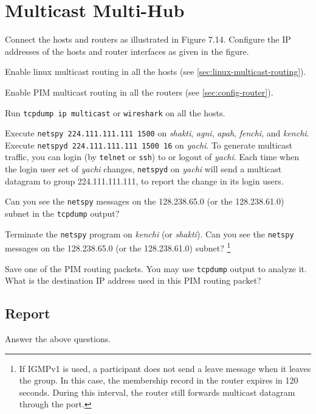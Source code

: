 \documentclass{../UTNetLab}
\begin{document}
\section{Multicast Multi-Hub}
    Connect the hosts and routers as illustrated in Figure 7.14.
    Configure the IP addresses of the hosts and router interfaces as given in the figure.


    Enable linux multicast routing in all the hosts (see \autoref{sec:linux-multicast-routing}).

    Enable PIM multicast routing in all the routers (see \autoref{sec:config-router}). 

    Run \lstinline{tcpdump ip multicast} or \lstinline{wireshark} on all the hosts. 

    Execute \lstinline{netspy 224.111.111.111 1500} on \textit{shakti}, \textit{agni}, \textit{apah}, \textit{fenchi}, and \textit{kenchi}.
    Execute \lstinline{netspyd 224.111.111.111 1500 16} on \textit{yachi}.
    To generate multicast traffic, you can login (by \lstinline{telnet} or \lstinline{ssh}) to or logout of \textit{yachi}.
    Each time when the login user set of \textit{yachi} changes, \lstinline{netspyd} on \textit{yachi} will send a multicast datagram to group 224.111.111.111, to report the change in its login users.

    Can you see the \lstinline{netspy} messages on the 128.238.65.0 (or the 128.238.61.0) subnet in the \lstinline{tcpdump} output? 

    Terminate the \lstinline{netspy} program on \textit{kenchi} (or \textit{shakti}).
    Can you see the \lstinline{netspy} messages on the 128.238.65.0 (or the 128.238.61.0) subnet?
    \footnote{If IGMPv1 is used, a participant does not send a leave message when it leaves the group.
    In this case, the membership record in the router expires in 120 seconds.
    During this interval, the router still forwards multicast datagram through the port.} 

    Save one of the PIM routing packets.
    You may use \lstinline{tcpdump} output to analyze it.
    What is the destination IP address used in this PIM routing packet?
    
    \subsection*{Report}
    Answer the above questions.
\end{document}
